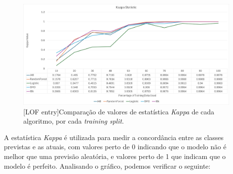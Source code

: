 \documentclass{easychair}
\begin{document}
\begin{figure}[H]
    \begin{centering}
    \includegraphics[width=1\linewidth]{imagens/figure33.jpg}\label{cap-5-fig33}
    [LOF entry]{Comparação de valores de estatística \textit{Kappa} de cada algoritmo, por cada \textit{training split}.}
    \label{fig33}
    \end{centering}
\end{figure}

A estatística \textit{Kappa} é utilizada para medir a concordância entre as classes previstas e as atuais, com valores perto de 0 indicando que o modelo não é melhor que uma previsão aleatória, e valores perto de 1 que indicam que o modelo é perfeito. Analisando o gráfico, podemos verificar o seguinte:
\end{document}
